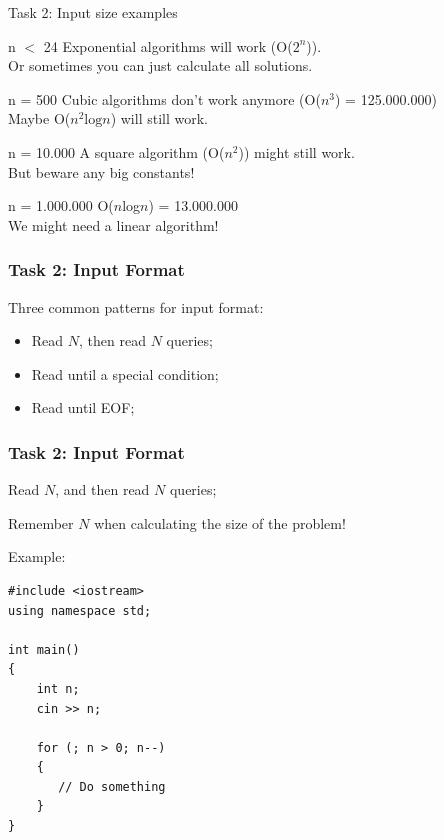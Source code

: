 \begin{frame}{Task 2: Input size examples}

  \begin{block}{n $<$ 24}
    Exponential algorithms will work (O($2^n$)).\\
    Or sometimes you can just calculate all solutions.
  \end{block}

  \begin{block}{n = 500}
    Cubic algorithms don't work anymore (O($n^3$) = 125.000.000)\\
    Maybe O($n^2\text{log}n$) will still work.
  \end{block}

  \begin{block}{n = 10.000}
    A square algorithm (O($n^2$)) might still work.\\
    But beware any big constants!
  \end{block}

  \begin{block}{n = 1.000.000}
    O($n$log$n$) = 13.000.000\\
    We might need a linear algorithm!
  \end{block}
\end{frame}

\begin{frame}
  \frametitle{Task 2: Input Format}

  Three common patterns for input format:
  \vfill

  \begin{itemize}
  \item Read $N$, then read $N$ queries;
  \bigskip

  \item Read until a special condition;
  \bigskip

  \item Read until EOF;
  \end{itemize}
\end{frame}

\begin{frame}[fragile]
  \frametitle{Task 2: Input Format}
  \begin{block}{}
    Read $N$, and then read $N$ queries;
    \bigskip

    Remember $N$ when calculating the size of the problem!
  \end{block}
  Example: 

{\smaller
\begin{verbatim}
#include <iostream>
using namespace std;

int main()
{
    int n;
    cin >> n;

    for (; n > 0; n--)
    {
       // Do something
    }
}
\end{verbatim}}

\end{frame}

